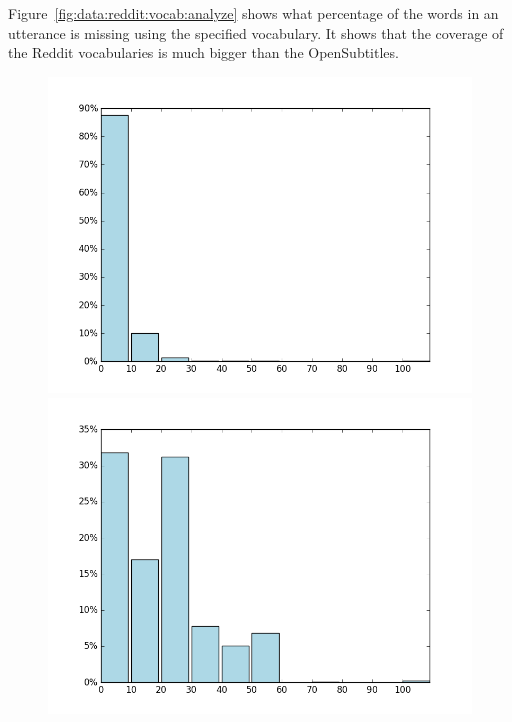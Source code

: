 Figure~\ref{fig:data:reddit:vocab:analyze} shows what percentage of the words in an utterance is missing using the specified vocabulary. It shows that the coverage of the Reddit vocabularies is much bigger than the OpenSubtitles.

\begin{figure}[H]
	\includegraphics[width=\linewidth]{img/reddit_vocab_analyze_100k_perc.PNG}
	\centering
	\small
	\endminipage\hfill
	\includegraphics[width=\linewidth]{img/opus_vocab_analyze_100k_perc.PNG}
	\centering
	\small
	\endminipage\hfill

\end{figure}
